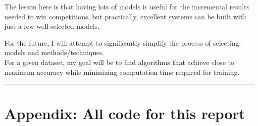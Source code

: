 \documentclass[
]{article}
\begin{document}
The lesson here is that having lots of models is useful for the
incremental results needed to win competitions, but practically,
excellent systems can be built with just a few well-selected models.

For the future, I will attempt to significantly simplify the process of
selecting models and methods/techniques.\\
For a given dataset, my goal will be to find algorithms that achieve
close to maximum accuracy while minimizing computation time required for
training.

\begin{center}\rule{0.5\linewidth}{0.5pt}\end{center}

\newpage

\hypertarget{appendix-all-code-for-this-report}{%
\section{Appendix: All code for this
report}\label{appendix-all-code-for-this-report}}
\end{document}
